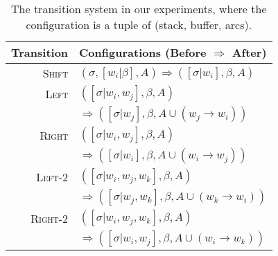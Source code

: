 \documentclass[11pt,a4paper]{article}
\begin{document}
    \begin{table}[h!]
    \begin{tabular}{r | l }
      Transition & Configurations (Before $\Rightarrow$ After)\\
      \hline
      \textsc{Shift} &    $(\sigma, [w_i|\beta], A) \Rightarrow  ([\sigma|w_i], \beta, A) $  \\
      {\textsc{Left}} & $([\sigma|w_i, w_j], \beta, A)$\\
      & $\Rightarrow([\sigma|w_j], \beta, A\cup{(w_j \rightarrow w_i)}) $ \\
      {\textsc{Right}} & $([\sigma|w_i, w_j], \beta, A)$\\
      & $\Rightarrow([\sigma|w_i], \beta, A\cup{(w_i \rightarrow w_j)}) $ \\
      {\textsc{Left-2}} & $([\sigma|w_i, w_j, w_k], \beta, A)$\\
      & $\Rightarrow([\sigma|w_j, w_k], \beta, A\cup{(w_k \rightarrow w_i)}) $ \\
      {\textsc{Right-2}} & $([\sigma|w_i, w_j, w_k], \beta, A)$\\
      & $\Rightarrow([\sigma|w_i, w_j], \beta, A\cup{(w_i \rightarrow w_k)}) $ \\
    \end{tabular}
    \caption{The transition system in our experiments, where the configuration is a tuple of (stack, buffer, arcs).}\label{tab:feat}
    \end{table}

\end{document}
